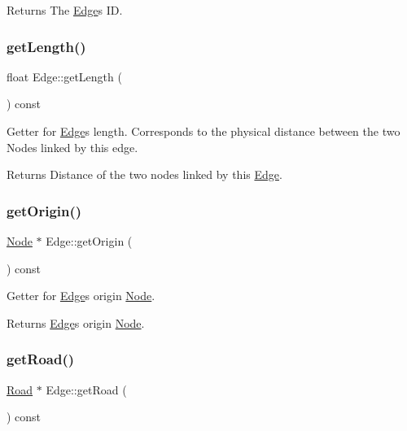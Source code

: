 \begin{DoxyReturn}{Returns}
The \hyperlink{class_edge}{Edge}\textquotesingle{}s ID. 
\end{DoxyReturn}
\hypertarget{class_edge_ae96241bc7956c47dba61f7a0cfec01c3}{}\label{class_edge_ae96241bc7956c47dba61f7a0cfec01c3} 
\subsubsection{\texorpdfstring{get\+Length()}{getLength()}}
{\footnotesize\ttfamily float Edge\+::get\+Length (\begin{DoxyParamCaption}{ }\end{DoxyParamCaption}) const}

Getter for \hyperlink{class_edge}{Edge}\textquotesingle{}s length. Corresponds to the physical distance between the two Nodes linked by this edge.

\begin{DoxyReturn}{Returns}
Distance of the two nodes linked by this \hyperlink{class_edge}{Edge}. 
\end{DoxyReturn}
\hypertarget{class_edge_a04719c702ae24dcfbce3874a573ca360}{}\label{class_edge_a04719c702ae24dcfbce3874a573ca360} 
\subsubsection{\texorpdfstring{get\+Origin()}{getOrigin()}}
{\footnotesize\ttfamily \hyperlink{class_node}{Node} $\ast$ Edge\+::get\+Origin (\begin{DoxyParamCaption}{ }\end{DoxyParamCaption}) const}

Getter for \hyperlink{class_edge}{Edge}\textquotesingle{}s origin \hyperlink{class_node}{Node}.

\begin{DoxyReturn}{Returns}
\hyperlink{class_edge}{Edge}\textquotesingle{}s origin \hyperlink{class_node}{Node}. 
\end{DoxyReturn}
\hypertarget{class_edge_ae967ccaa1db4dba903ccfb3c55be9bc5}{}\label{class_edge_ae967ccaa1db4dba903ccfb3c55be9bc5} 
\subsubsection{\texorpdfstring{get\+Road()}{getRoad()}}
{\footnotesize\ttfamily \hyperlink{class_road}{Road} $\ast$ Edge\+::get\+Road (\begin{DoxyParamCaption}{ }\end{DoxyParamCaption}) const}


